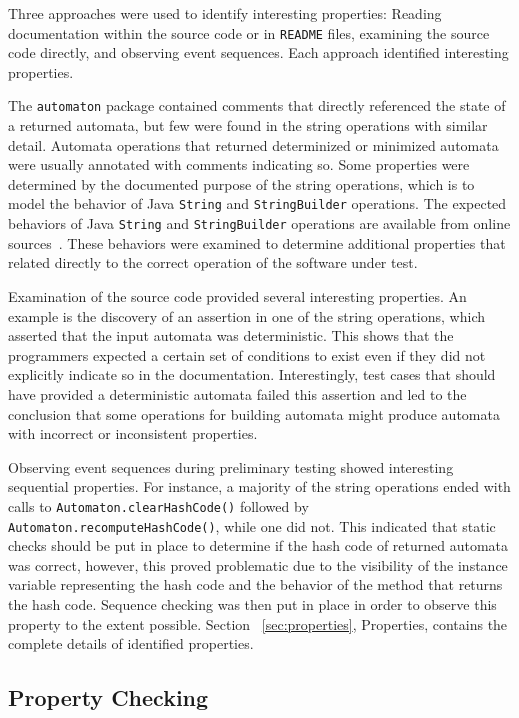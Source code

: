 \documentclass[letterpaper,sigplan]{acmart}
\begin{document}
Three approaches were used to identify interesting properties: Reading
documentation within the source code or in \texttt{README} files, examining the
source code directly, and observing event sequences.  Each approach identified
interesting properties.

The \lstinline{automaton} package contained comments that directly referenced
the state of a returned automata, but few were found in the string operations
with similar detail.  Automata operations that returned determinized or
minimized automata were usually annotated with comments indicating so.  Some
properties were determined by the documented purpose of the string operations,
which is to model the behavior of Java \lstinline{String} and
\lstinline{StringBuilder} operations.  The expected behaviors of Java
\lstinline{String} and \lstinline{StringBuilder} operations are available from
online sources~\cite{oracle-java-string,oracle-java-stringbuilder}.  These
behaviors were examined to determine additional properties that related
directly to the correct operation of the software under test.

Examination of the source code provided several interesting properties.  An
example is the discovery of an assertion in one of the string operations, which
asserted that the input automata was deterministic.  This shows that the
programmers expected a certain set of conditions to exist even if they did not
explicitly indicate so in the documentation.  Interestingly, test cases that
should have provided a deterministic automata failed this assertion and led to
the conclusion that some operations for building automata might produce
automata with incorrect or inconsistent properties.

Observing event sequences during preliminary testing showed interesting
sequential properties.  For instance, a majority of the string operations ended
with calls to \lstinline{Automaton.clearHashCode()} followed by
\lstinline{Automaton.recomputeHashCode()}, while one did not.  This indicated
that static checks should be put in place to determine if the hash code of
returned automata was correct, however, this proved problematic due to the
visibility of the instance variable representing the hash code and the behavior
of the method that returns the hash code. Sequence checking was then put in
place in order to observe this property to the extent possible.  Section
~\ref{sec:properties}, Properties, contains the complete details of identified
properties.

\subsection{Property Checking}
\end{document}
